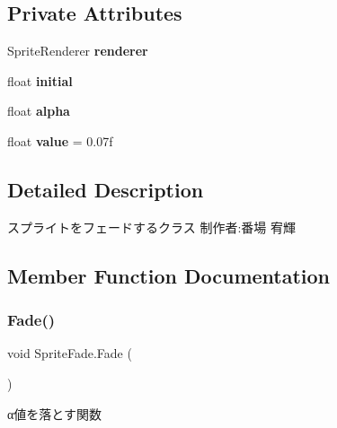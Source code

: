\subsection*{Private Attributes}
\begin{DoxyCompactItemize}
\item 
\mbox{\label{class_sprite_fade_aaada7317037f9bd1f809bbf7f37edef5}} 
Sprite\+Renderer {\bfseries renderer}
\item 
\mbox{\label{class_sprite_fade_aa35a9a416e9614abdcf7e0188b81ef8c}} 
float {\bfseries initial}
\item 
\mbox{\label{class_sprite_fade_aa19dccfbc89ddba249337aff7fb52062}} 
float {\bfseries alpha}
\item 
\mbox{\label{class_sprite_fade_ade060753832dcc635476973e8b05d609}} 
float {\bfseries value} = 0.\+07f
\end{DoxyCompactItemize}


\subsection{Detailed Description}
スプライトをフェードするクラス 制作者\+:番場 宥輝 



\subsection{Member Function Documentation}
\mbox{\label{class_sprite_fade_acf3e6391bf02c5f324e73b21856533b9}} 
\subsubsection{\texorpdfstring{Fade()}{Fade()}}
{\footnotesize\ttfamily void Sprite\+Fade.\+Fade (\begin{DoxyParamCaption}{ }\end{DoxyParamCaption})\hspace{0.3cm}{\ttfamily [inline]}}



α値を落とす関数 

\mbox{\label{class_sprite_fade_ad53e994f9ff104a538660e50bf6491ed}} 
